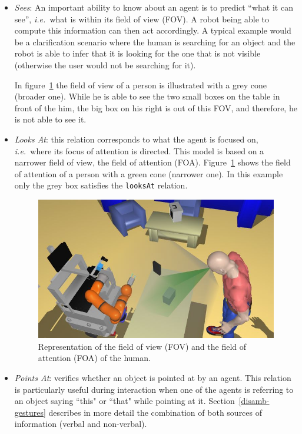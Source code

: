 \documentclass[twocolumn]{svjour3}
\newcommand{\concept}[1]{{\footnotesize \texttt{#1}}}
\newcommand{\ie}{{\textit{i.e.~}}}
\begin{document}
\begin{itemize}

\item \emph{Sees}: An important ability to know about an agent is to predict
``what it can see'', \ie what is within its field of view (FOV). A robot being
able to compute this information can then act accordingly. A typical example
would be a clarification scenario where the human is searching for an object
and the robot is able to infer that it is looking for the one that is not
visible (otherwise the user would not be searching for it).

In figure~\ref{fig::vis} the field of view of a person is illustrated with a
grey cone (broader one). While he is able to see the two small boxes on the
table in front of the him, the big box on his right is out of this FOV, and
therefore, he is not able to see it. 

\item \emph{Looks At}: this relation corresponds to what the agent is focused
on, \ie where its focus of attention is directed. This model is based on a
narrower field of view, the field of attention (FOA). Figure~\ref{fig::vis}
shows the field of attention of a person with a green cone (narrower one). In
this example only the grey box satisfies the \concept{looksAt} relation.

\begin{figure}[!t] \centering
\includegraphics[width=\columnwidth]{images/looks.jpg} \caption{Representation
of the field of view (FOV) and the field of attention (FOA) of the human.}
\label{fig::vis} \end{figure}

\item \emph{Points At}: verifies whether an object is pointed at by an agent.
This relation is particularly useful during interaction when one of the agents
is referring to an object saying ``this" or ``that" while pointing at it.
Section~\ref{disamb-gestures} describes in more detail the combination of both
sources of information (verbal and non-verbal).
 

\end{itemize}
\end{document}

